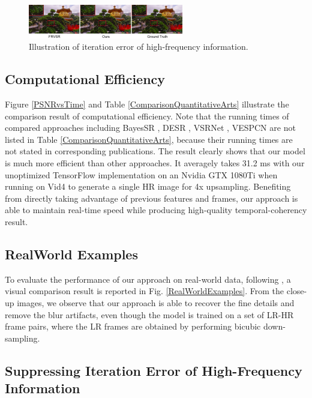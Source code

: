 \documentclass[letterpaper]{article} %
\begin{document}
\begin{figure}[t]
\centering
\includegraphics[width=6.800000000000001 cm,height=0.58in ]{Fig10.png}
\caption{Illustration of iteration error of high-frequency information.}
\label{SuppressingFigure}
\end{figure}



\subsection{Computational Efficiency}


Figure \ref{PSNRvsTime} and Table \ref{ComparisonQuantitativeArts} illustrate the comparison result of computational efficiency. Note that the running times of compared approaches including BayesSR \cite{BayesSR2011cvpr}, DESR \cite{DESR2015iccv}, VSRNet \cite{VSRNet2016TCT}, VESPCN \cite{VESPCN2017cvpr} are not listed in Table \ref{ComparisonQuantitativeArts}, because their running times are not stated in corresponding publications. The result clearly shows that our model is much more efficient than other approaches. It averagely takes 31.2 ms with our unoptimized TensorFlow implementation on an Nvidia GTX 1080Ti when running on Vid4 to generate a single HR image for 4x upsampling. Benefiting from directly taking advantage of previous features and frames, our approach is able to maintain real-time speed while producing high-quality temporal-coherency result.


\vspace{-2.86mm}
\subsection{RealWorld Examples}


To evaluate the performance of our approach on real-world data, following \cite{VESPCN2017cvpr}, a visual comparison result is reported in Fig. \ref{RealWorldExamples}. From the close-up images, we observe that our approach is able to recover the fine details and remove the blur artifacts, even though the model is trained on a set of LR-HR frame pairs, where the LR frames are obtained by performing bicubic down-sampling.



\vspace{-3.19mm}
\subsection{Suppressing Iteration Error of High-Frequency Information}
\end{document}
